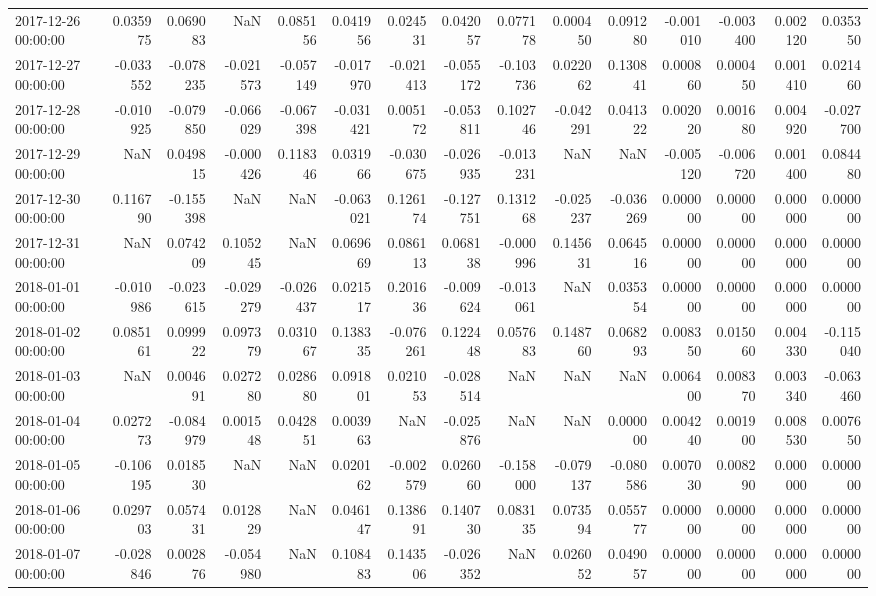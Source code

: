 \begin{tabular}{lrrrrrrrrrrrrrr}
2017-12-26 00:00:00 & 0.035975 & 0.069083 & NaN & 0.085156 & 0.041956 & 0.024531 & 0.042057 & 0.077178 & 0.000450 & 0.091280 & -0.001010 & -0.003400 & 0.002120 & 0.035350 \\
2017-12-27 00:00:00 & -0.033552 & -0.078235 & -0.021573 & -0.057149 & -0.017970 & -0.021413 & -0.055172 & -0.103736 & 0.022062 & 0.130841 & 0.000860 & 0.000450 & 0.001410 & 0.021460 \\
2017-12-28 00:00:00 & -0.010925 & -0.079850 & -0.066029 & -0.067398 & -0.031421 & 0.005172 & -0.053811 & 0.102746 & -0.042291 & 0.041322 & 0.002020 & 0.001680 & 0.004920 & -0.027700 \\
2017-12-29 00:00:00 & NaN & 0.049815 & -0.000426 & 0.118346 & 0.031966 & -0.030675 & -0.026935 & -0.013231 & NaN & NaN & -0.005120 & -0.006720 & 0.001400 & 0.084480 \\
2017-12-30 00:00:00 & 0.116790 & -0.155398 & NaN & NaN & -0.063021 & 0.126174 & -0.127751 & 0.131268 & -0.025237 & -0.036269 & 0.000000 & 0.000000 & 0.000000 & 0.000000 \\
2017-12-31 00:00:00 & NaN & 0.074209 & 0.105245 & NaN & 0.069669 & 0.086113 & 0.068138 & -0.000996 & 0.145631 & 0.064516 & 0.000000 & 0.000000 & 0.000000 & 0.000000 \\
2018-01-01 00:00:00 & -0.010986 & -0.023615 & -0.029279 & -0.026437 & 0.021517 & 0.201636 & -0.009624 & -0.013061 & NaN & 0.035354 & 0.000000 & 0.000000 & 0.000000 & 0.000000 \\
2018-01-02 00:00:00 & 0.085161 & 0.099922 & 0.097379 & 0.031067 & 0.138335 & -0.076261 & 0.122448 & 0.057683 & 0.148760 & 0.068293 & 0.008350 & 0.015060 & 0.004330 & -0.115040 \\
2018-01-03 00:00:00 & NaN & 0.004691 & 0.027280 & 0.028680 & 0.091801 & 0.021053 & -0.028514 & NaN & NaN & NaN & 0.006400 & 0.008370 & 0.003340 & -0.063460 \\
2018-01-04 00:00:00 & 0.027273 & -0.084979 & 0.001548 & 0.042851 & 0.003963 & NaN & -0.025876 & NaN & NaN & 0.000000 & 0.004240 & 0.001900 & 0.008530 & 0.007650 \\
2018-01-05 00:00:00 & -0.106195 & 0.018530 & NaN & NaN & 0.020162 & -0.002579 & 0.026060 & -0.158000 & -0.079137 & -0.080586 & 0.007030 & 0.008290 & 0.000000 & 0.000000 \\
2018-01-06 00:00:00 & 0.029703 & 0.057431 & 0.012829 & NaN & 0.046147 & 0.138691 & 0.140730 & 0.083135 & 0.073594 & 0.055777 & 0.000000 & 0.000000 & 0.000000 & 0.000000 \\
2018-01-07 00:00:00 & -0.028846 & 0.002876 & -0.054980 & NaN & 0.108483 & 0.143506 & -0.026352 & NaN & 0.026052 & 0.049057 & 0.000000 & 0.000000 & 0.000000 & 0.000000 \\

\end{tabular}
